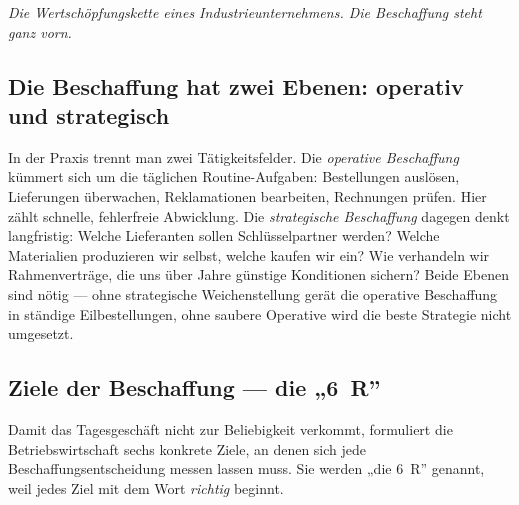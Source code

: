 \documentclass[11pt, a4paper]{article}
\begin{document}
\begin{center}
\end{center}
\vspace{-0.5em}
\begin{center}\small\itshape\color{bfwInkSoft}Die Wertschöpfungskette eines Industrieunternehmens. Die Beschaffung steht ganz vorn.\end{center}

\subsection{Die Beschaffung hat zwei Ebenen: operativ und strategisch}

In der Praxis trennt man zwei Tätigkeitsfelder. Die \emph{operative Beschaffung} kümmert
sich um die täglichen Routine-Aufgaben: Bestellungen auslösen, Lieferungen überwachen,
Reklamationen bearbeiten, Rechnungen prüfen. Hier zählt schnelle, fehlerfreie
Abwicklung. Die \emph{strategische Beschaffung} dagegen denkt langfristig: Welche
Lieferanten sollen Schlüsselpartner werden? Welche Materialien produzieren wir selbst,
welche kaufen wir ein? Wie verhandeln wir Rahmenverträge, die uns über Jahre günstige
Konditionen sichern? Beide Ebenen sind nötig --- ohne strategische Weichenstellung gerät
die operative Beschaffung in ständige Eilbestellungen, ohne saubere Operative wird die
beste Strategie nicht umgesetzt.

\subsection{Ziele der Beschaffung --- die „6~R”}

Damit das Tagesgeschäft nicht zur Beliebigkeit verkommt, formuliert die Betriebswirtschaft
sechs konkrete Ziele, an denen sich jede Beschaffungsentscheidung messen lassen muss.
Sie werden „die 6~R” genannt, weil jedes Ziel mit dem Wort \emph{richtig} beginnt.
\end{document}
